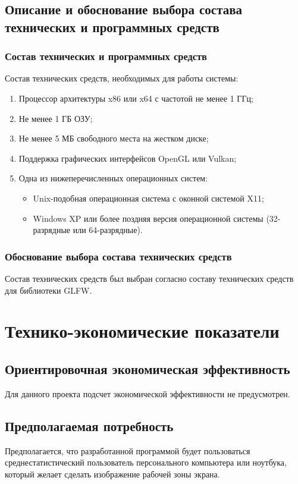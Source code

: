 \documentclass[a4paper,12pt]{article}
\begin{document}
  \subsection{Описание и обоснование выбора состава технических и программных средств}
  \subsubsection{Состав технических и программных средств}
  Состав технических средств, необходимых для работы системы:
  \begin{enumerate}
    \item Процессор архитектуры x86 или x64 с частотой не менее 1 ГГц;
    \item Не менее 1 ГБ ОЗУ;
    \item Не менее 5 МБ свободного места на жестком диске;
    \item Поддержка графических интерфейсов OpenGL или Vulkan;
    \item Одна из нижеперечисленных операционных систем:
    \begin{itemize}
      \item Unix-подобная операционная система с оконной системой X11;
      \item Windows XP или более поздняя версия операционной системы (32-разрядные или 64-разрядные).
    \end{itemize}
  \end{enumerate}

  \subsubsection{Обоснование выбора состава технических средств}
  Состав технических средств был выбран согласно составу технических средств для библиотеки GLFW.

  \newpage
  \section{Технико-экономические показатели}
  \subsection{Ориентировочная экономическая эффективность}
  Для данного проекта подсчет экономической эффективности не предусмотрен.

  \subsection{Предполагаемая потребность}
  Предполагается, что разработанной программой будет пользоваться среднестатистический пользователь персонального компьютера или ноутбука, который желает сделать изображение рабочей зоны экрана.
\end{document}
